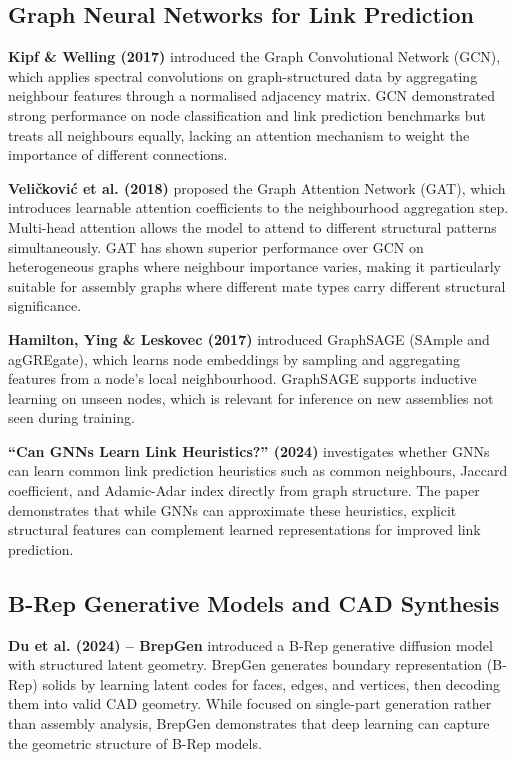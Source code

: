 \documentclass[12pt]{report}
\begin{document}
\subsection{Graph Neural Networks for Link Prediction}

\textbf{Kipf \& Welling (2017)} introduced the Graph Convolutional Network (GCN), which applies spectral convolutions on graph-structured data by aggregating neighbour features through a normalised adjacency matrix. GCN demonstrated strong performance on node classification and link prediction benchmarks but treats all neighbours equally, lacking an attention mechanism to weight the importance of different connections.

\textbf{Veli\v{c}kovi\'{c} et al. (2018)} proposed the Graph Attention Network (GAT), which introduces learnable attention coefficients to the neighbourhood aggregation step. Multi-head attention allows the model to attend to different structural patterns simultaneously. GAT has shown superior performance over GCN on heterogeneous graphs where neighbour importance varies, making it particularly suitable for assembly graphs where different mate types carry different structural significance.

\textbf{Hamilton, Ying \& Leskovec (2017)} introduced GraphSAGE (SAmple and agGREgate), which learns node embeddings by sampling and aggregating features from a node's local neighbourhood. GraphSAGE supports inductive learning on unseen nodes, which is relevant for inference on new assemblies not seen during training.

\textbf{``Can GNNs Learn Link Heuristics?'' (2024)} investigates whether GNNs can learn common link prediction heuristics such as common neighbours, Jaccard coefficient, and Adamic-Adar index directly from graph structure. The paper demonstrates that while GNNs can approximate these heuristics, explicit structural features can complement learned representations for improved link prediction.

\subsection{B-Rep Generative Models and CAD Synthesis}

\textbf{Du et al. (2024) -- BrepGen} introduced a B-Rep generative diffusion model with structured latent geometry. BrepGen generates boundary representation (B-Rep) solids by learning latent codes for faces, edges, and vertices, then decoding them into valid CAD geometry. While focused on single-part generation rather than assembly analysis, BrepGen demonstrates that deep learning can capture the geometric structure of B-Rep models.
\end{document}
